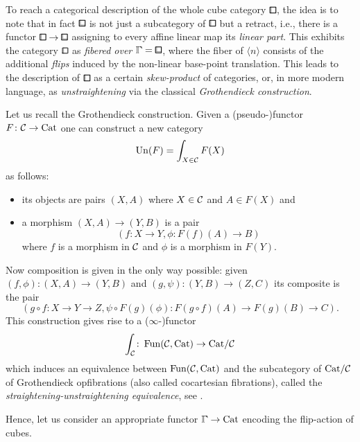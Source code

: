 To reach a categorical description of the whole cube category $\bbox$,
the idea is to note that in fact $\bblox$ is not just a subcategory of $\bbox$ but a retract,
i.e., there is a functor $\bbox\to \bblox$ assigning to every affine linear map its \emph{linear part}.
This exhibits the category $\bbox$ as \emph{fibered over $\bbGamma=\bblox$},
where the fiber of $\langle n\rangle$ consists of the additional \emph{flips} induced by the non-linear base-point translation.
This leads to the description of $\bbox$ as a certain \emph{skew-product} of categories,
or, in more modern language, as \emph{unstraightening} via the classical \emph{Grothendieck construction}.


\begin{construction}\label{cons:unstraightening}
Let us recall the Grothendieck construction.
Given a (pseudo-)functor $F\colon\mathcal{C}\to\mathrm{Cat}$ one can construct a new category
\[
    \mathrm{Un}(F)=\int_{X\in\mathcal{C}} F(X)
\]
as follows:
\begin{itemize}
    \item its objects are pairs $(X,A)$ where $X\in\mathcal{C}$ and $A\in F(X)$ and
    \item a morphism $(X,A)\to (Y,B)$ is a pair
    \[(f\colon X\to Y,\phi\colon F(f)(A)\to B)\]
where $f$ is a morphism in $\mathcal{C}$ and $\phi$ is a morphism in $F(Y)$.
    \end{itemize}
Now composition is given in the only way possible:
given $(f,\phi)\colon (X,A)\to (Y,B)$ and $(g,\psi)\colon (Y,B)\to (Z,C)$ its composite is the pair
\[
    (g\circ f\colon X\to Y\to Z,\psi\circ F(g)(\phi)\colon F(g\circ f)(A)\to F(g)(B)\to C).
\]
This construction gives rise to a ($\infty$-)functor
\[
    \int_{\mathcal{C}}\colon\operatorname{Fun}(\mathcal{C},\mathrm{Cat})\to\mathrm{Cat}/\mathcal{C}
\]
which induces an equivalence between $\operatorname{Fun}(\mathcal{C},\mathrm{Cat})$ and the subcategory of $\mathrm{Cat}/\mathcal{C}$
of Grothendieck opfibrations (also called cocartesian fibrations), called the \emph{straightening-unstraightening equivalence}, see \cite[Chapter 3]{Lurie2009}.
\end{construction}


Hence, let us consider an appropriate functor $\bbGamma\to \Cat$ encoding the flip-action of cubes.

